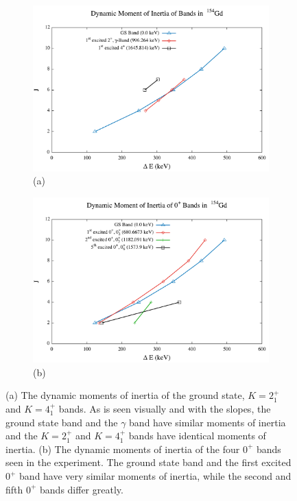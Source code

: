 \begin{figure}[!]
    \begin{subfigure}{\textwidth}
    \centering
    \includegraphics[scale=0.4]{Discussion/154_Dynamic.pdf}
    \caption*{(a)}
    \end{subfigure}
    \begin{subfigure}{\textwidth}
    \centering
    \includegraphics[scale=0.4]{Discussion/154_Dynamic0.pdf}
    \caption*{(b)}
    \end{subfigure}
    \caption{(a) The dynamic moments of inertia of the ground state, $K=2^+_1$ and $K=4^+_1$ bands. As is seen visually and with the slopes, the ground state band and the $\gamma$ band have similar moments of inertia and the $K=2^+_1$ and $K=4^+_1$ bands have identical moments of inertia. (b) The dynamic moments of inertia of the four $0^+$ bands seen in the experiment. The ground state band and the first excited $0^+$ band have very similar moments of inertia, while the second and fifth $0^+$ bands differ greatly.}
    \label{fig:154_Dynamic}
\end{figure}